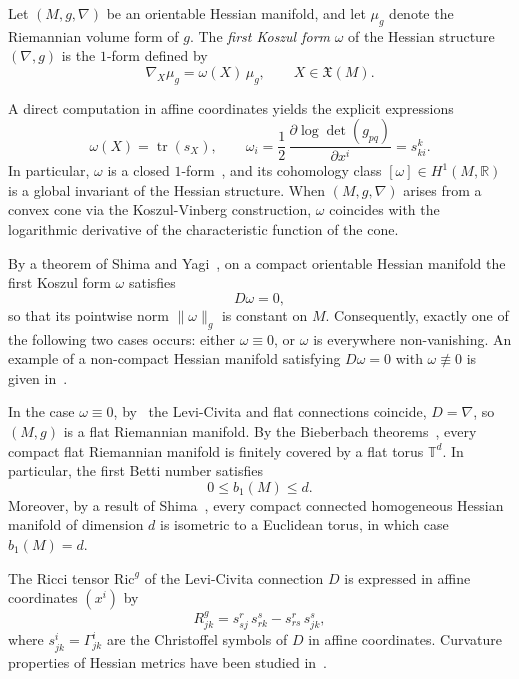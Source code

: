 \begin{defn}
Let $(M, g, \nabla)$ be an orientable Hessian manifold, and let $\mu_g$ denote 
the Riemannian volume form of $g$. The \emph{first Koszul form} $\omega$ of the 
Hessian structure $(\nabla, g)$ is the $1$-form defined by
\[
  \nabla_X \mu_g = \omega(X)\, \mu_g,
  \qquad X \in \mathfrak{X}(M).
\]
\end{defn}

A direct computation in affine coordinates yields the explicit expressions
\[
  \omega(X) = \operatorname{tr}(s_X), \qquad
  \omega_i
  = \frac{1}{2}\,\frac{\partial \log \det(g_{pq})}{\partial x^i}
  = s^k_{ki}.
\]
In particular, $\omega$ is a closed $1$-form~\citep{shima2007}, and its 
cohomology class $[\omega] \in H^1(M, \mathbb{R})$ is a global invariant of the 
Hessian structure. When $(M, g, \nabla)$ arises from a convex cone via the 
Koszul-Vinberg construction, $\omega$ coincides with the logarithmic derivative 
of the characteristic function of the cone.

By a theorem of Shima and Yagi~\citep[Theorem~4.1]{shima1997}, on a 
compact orientable Hessian manifold the first Koszul form $\omega$ satisfies
\[
  D\omega = 0,
\]
so that its pointwise norm $\|\omega\|_g$ is constant on $M$. Consequently, 
exactly one of the following two cases occurs: either $\omega \equiv 0$, or 
$\omega$ is everywhere non-vanishing. An example of a non-compact Hessian manifold 
satisfying $D\omega = 0$ with $\omega \not\equiv 0$ is given 
in~\citep[p.~282]{shima1997}.

In the case $\omega \equiv 0$, by~\citep[Theorem~4.2]{shima1997} the 
Levi-Civita and flat connections coincide, $D = \nabla$, so $(M, g)$ is a flat 
Riemannian manifold. By the Bieberbach 
theorems~\citep{bieberbach1911, wolf2023}, every compact 
flat Riemannian manifold is finitely covered by a flat torus $\mathbb{T}^d$. 
In particular, the first Betti number satisfies
\[
  0 \leq b_1(M) \leq d.
\]
Moreover, by a result of Shima~\citep[Corollary~6]{shima1980}, every 
compact connected homogeneous Hessian manifold of dimension $d$ is isometric to 
a Euclidean torus, in which case $b_1(M) = d$.

The Ricci tensor $\mathrm{Ric}^g$ of the Levi-Civita connection $D$ is expressed 
in affine coordinates $(x^i)$ by
\[
  R^g_{jk} = s^{r}_{sj}\, s^{s}_{rk} - s^{r}_{rs}\, s^{s}_{jk},
\]
where $s^i_{jk} = \Gamma^i_{jk}$ are the Christoffel symbols of $D$ in affine 
coordinates. Curvature properties of Hessian metrics have been studied 
in~\citep{shima2007, totaro2004, yilmaz2008}.

